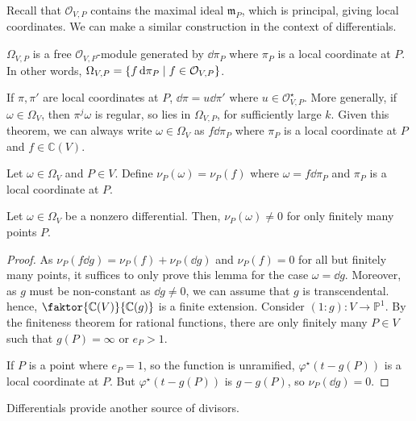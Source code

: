Recall that \( \mathcal O_{V,P} \) contains the maximal ideal \( \mathfrak m_P \), which is principal, giving local coordinates.
We can make a similar construction in the context of differentials.
\begin{theorem}
    \( \Omega_{V,P} \) is a free \( \mathcal O_{V,P} \)-module generated by \( \dd{\pi_P} \) where \( \pi_P \) is a local coordinate at \( P \).
    In other words, \( \Omega_{V,P} = \qty{f\dd{\pi_P} \mid f \in \mathcal O_{V,P}} \).
\end{theorem}
\begin{remark}
    If \( \pi, \pi' \) are local coordinates at \( P \), \( \dd{\pi} = u \dd{\pi'} \) where \( u \in \mathcal O_{V,P}^\star \).
    More generally, if \( \omega \in \Omega_V \), then \( \pi^j \omega \) is regular, so lies in \( \Omega_{V,P} \), for sufficiently large \( k \).
    Given this theorem, we can always write \( \omega \in \Omega_V \) as \( f \dd{\pi_P} \) where \( \pi_P \) is a local coordinate at \( P \) and \( f \in \mathbb C(V) \).
\end{remark}
\begin{definition}
    Let \( \omega \in \Omega_V \) and \( P \in V \).
    Define \( \nu_P(\omega) = \nu_P(f) \) where \( \omega = f \dd{\pi_P} \) and \( \pi_P \) is a local coordinate at \( P \).
\end{definition}
\begin{lemma}
    Let \( \omega \in \Omega_V \) be a nonzero differential.
    Then, \( \nu_P(\omega) \neq 0 \) for only finitely many points \( P \).
\end{lemma}
\begin{proof}
    As \( \nu_P(f \dd{g}) = \nu_P(f) + \nu_P(\dd{g}) \) and \( \nu_P(f) = 0 \) for all but finitely many points, it suffices to only prove this lemma for the case \( \omega = \dd{g} \).
    Moreover, as \( g \) must be non-constant as \( \dd{g} \neq 0 \), we can assume that \( g \) is transcendental.
    hence, \( \faktor{\mathbb C(V)}{\mathbb C(g)} \) is a finite extension.
    Consider \( (1 : g) \colon V \to \mathbb P^1 \).
    By the finiteness theorem for rational functions, there are only finitely many \( P \in V \) such that \( g(P) = \infty \) or \( e_P > 1 \).

    If \( P \) is a point where \( e_P = 1 \), so the function is unramified, \( \varphi^\star (t - g(P)) \) is a local coordinate at \( P \).
    But \( \varphi^\star(t-g(P)) \) is \( g - g(P) \), so \( \nu_P(\dd{g}) = 0 \).
\end{proof}
Differentials provide another source of divisors.
